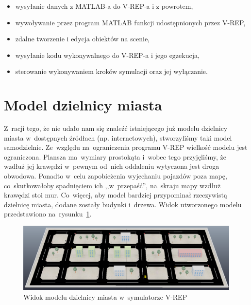 \documentclass[11pt, a4paper, twoside]{report}
\begin{document}
\begin{itemize}
	\item wysyłanie danych z MATLAB-a do V-REP-a i z powrotem,
	\item wywoływanie przez program MATLAB funkcji udostępnionych przez V-REP,
	\item zdalne tworzenie i edycja obiektów na scenie,
	\item wysyłanie kodu wykonywalnego do V-REP-a i jego egzekucja,
	\item sterowanie wykonywaniem kroków symulacji oraz jej wyłączanie.
\end{itemize}

\section{Model dzielnicy miasta}
Z~racji tego, że nie udało nam się znaleźć istniejącego już modelu dzielnicy miasta w~dostępnych źródłach (np. internetowych), stworzyliśmy taki model samodzielnie. Ze~względu na~ograniczenia programu V-REP wielkość modelu jest ograniczona. Plansza ma~wymiary prostokąta i~wobec tego przyjęliśmy, że wzdłuż jej krawędzi w~pewnym od~nich oddaleniu wytyczona jest droga obwodowa. Ponadto w~celu zapobieżenia wyjechaniu pojazdów poza mapę, co~skutkowałoby spadnięciem ich ,,w~przepaść'', na~skraju mapy wzdłuż krawędzi stoi mur. Co~więcej, aby model bardziej przypominał rzeczywistą dzielnicę miasta, dodane zostały budynki i~drzewa. Widok utworzonego modelu przedstawiono na~rysunku~\ref{fig:district}. 
\begin{figure}[!h]
	\centering
	\includegraphics[width=.95\linewidth]{cityDistrict}
	\caption{Widok modelu dzielnicy miasta w~symulatorze V-REP}
	\label{fig:district}
\end{figure}
\end{document}

